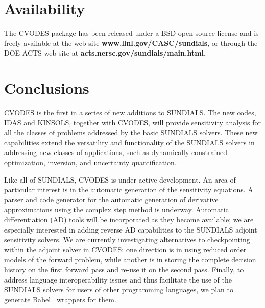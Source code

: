 \section{Availability}\label{s:availability}

The CVODES package has been released under a BSD open source license and is 
freely available at the web site
{\bf www.llnl.gov/CASC/sundials},
or through the DOE ACTS web site at
{\bf acts.nersc.gov/sundials/main.html}.

\section{Conclusions}\label{s:conclusions}

CVODES is the first in a series of new additions to SUNDIALS. The new codes,
IDAS and KINSOLS, together with CVODES, will provide sensitivity analysis
for all the classes of problems addressed by the basic SUNDIALS solvers.
These new capabilities extend the versatility and functionality of the SUNDIALS
solvers in addressing new classes of applications, such as dynamically-constrained
optimization, inversion, and uncertainty quantification.

Like all of SUNDIALS, CVODES is under active development.
An area of particular interest is in the automatic generation of the sensitivity 
equations. A parser and code generator for the automatic generation of derivative
approximations using the complex step method is underway.
Automatic differentiation (AD) tools will be incorporated as they become available;
we are especially interested in adding reverse AD capabilities to the SUNDIALS
adjoint sensitivity solvers.
We are currently investigating alternatives to checkpointing within 
the adjoint solver in CVODES: one direction is in using reduced order models of the 
forward problem, while another is in storing the complete decision history on the
first forward pass and re-use it on the second pass.
Finally, to address language interoperability issues and thus facilitate the use
of the SUNDIALS solvers for users of other programming languages, we plan to
generate Babel~\cite{KKPR:01} wrappers for them.
 
